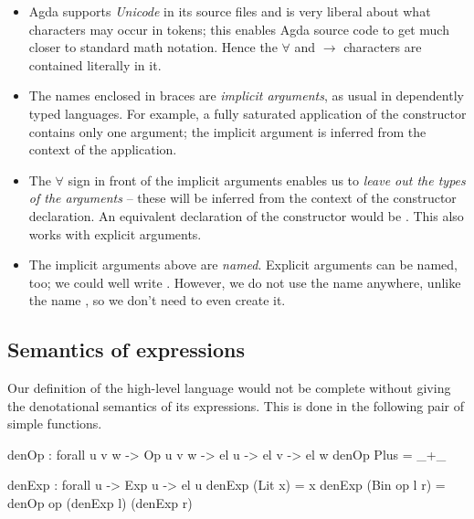 \begin{itemize}
	\item Agda supports \emph{Unicode} in its source files and is very liberal about what
		characters may occur in tokens; this enables Agda source code to get much closer
		to standard math notation. Hence the $\forall$ and $\to$ characters
		are contained literally in it.
		
	\item The names enclosed in braces are \emph{implicit arguments}, as usual
		in dependently typed languages. For example, a fully saturated application of the
		constructor  contains only one argument; the implicit argument
		 is inferred from the context of the application.
		
	\item The $\forall$ sign in front of the implicit arguments enables us to \emph{leave
		out the types of the arguments} -- these will be inferred from the context of
		the constructor declaration. An equivalent declaration of the constructor 
		would be .
		This also works with explicit arguments. 

	\item The implicit arguments above are \emph{named}. Explicit arguments can be named, too;
		we could well write .
		However, we do not use the name  anywhere, unlike the name ,
		so we don't need to even create it.
		
\end{itemize}


\subsection{Semantics of expressions}

Our definition of the high-level language would not be complete without giving
the denotational semantics of its expressions. This is done in the following
pair of simple functions.

\begin{code}
  denOp : forall {u v w} -> Op u v w -> el u -> el v -> el w
  denOp Plus = _+\_

  denExp : forall {u} -> Exp u -> el u
  denExp (Lit x) = x
  denExp (Bin op l r) = denOp op (denExp l) (denExp r)
\end{code}

